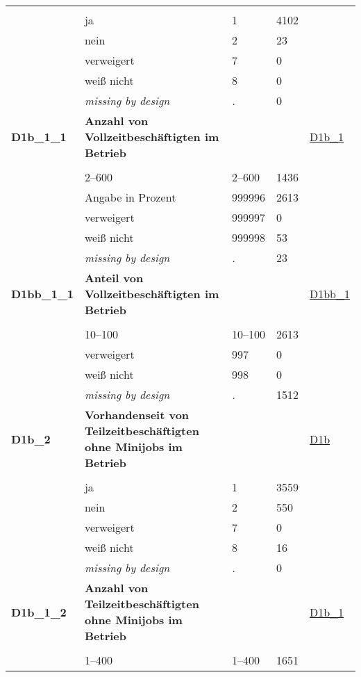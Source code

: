 \begin{longtable}{| L{2.65cm} | L{8cm} | C{1.5cm} | R{1.25cm} | C{2.25cm}  |}
   &  &  &  &  \\ 
   & ja & 1 & 4102 &  \\ 
   & nein & 2 & 23 &  \\ 
   & verweigert & 7 & 0 &  \\ 
   & weiß nicht & 8 & 0 &  \\ 
   & \textit{missing by design} & \textit{.} & 0 &  \\ 
   \midrule
\textbf{D1b\_1\_1}\label{var:D1b:1:1} & \textbf{Anzahl von Vollzeitbeschäftigten im Betrieb} &  &  & \hyperref[D1b:1]{D1b\_1} \\ 
   &  &  &  &  \\ 
   & 2--600 & 2--600 & 1436 &  \\ 
   & Angabe in Prozent & 999996 & 2613 &  \\ 
   & verweigert & 999997 & 0 &  \\ 
   & weiß nicht & 999998 & 53 &  \\ 
   & \textit{missing by design} & \textit{.} & 23 &  \\ 
   \midrule
\textbf{D1bb\_1\_1}\label{var:D1bb:1:1} & \textbf{Anteil von Vollzeitbeschäftigten im Betrieb} &  &  & \hyperref[D1bb:1]{D1bb\_1} \\ 
   &  &  &  &  \\ 
   & 10--100 & 10--100 & 2613 &  \\ 
   & verweigert & 997 & 0 &  \\ 
   & weiß nicht & 998 & 0 &  \\ 
   & \textit{missing by design} & \textit{.} & 1512 &  \\ 
   \midrule
\textbf{D1b\_2}\label{var:D1b:2} & \textbf{Vorhandenseit von Teilzeitbeschäftigten ohne Minijobs im Betrieb} &  &  & \hyperref[D1b]{D1b} \\ 
   &  &  &  &  \\ 
   & ja & 1 & 3559 &  \\ 
   & nein & 2 & 550 &  \\ 
   & verweigert & 7 & 0 &  \\ 
   & weiß nicht & 8 & 16 &  \\ 
   & \textit{missing by design} & \textit{.} & 0 &  \\ 
   \midrule
\textbf{D1b\_1\_2}\label{var:D1b:1:2} & \textbf{Anzahl von Teilzeitbeschäftigten ohne Minijobs im Betrieb} &  &  & \hyperref[D1b:1]{D1b\_1} \\ 
   &  &  &  &  \\ 
   & 1--400 & 1--400 & 1651 &  \\ 

\end{longtable}
